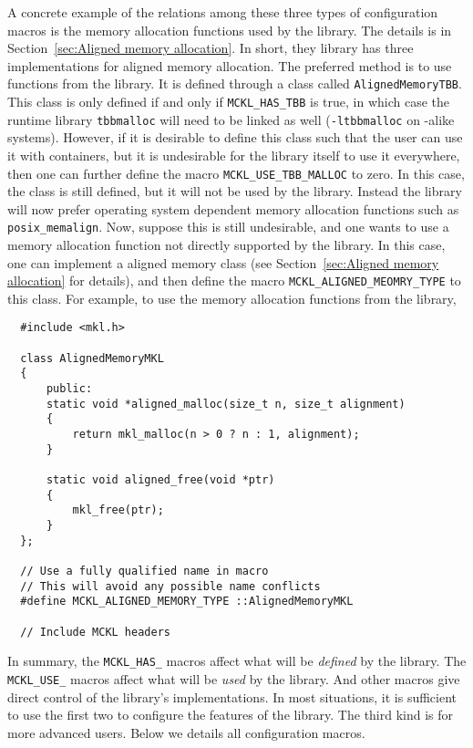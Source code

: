 A concrete example of the relations among these three types of configuration
macros is the memory allocation functions used by the library. The details is
in Section~\ref{sec:Aligned memory allocation}. In short, they library has
three implementations for aligned memory allocation. The preferred method is to
use functions from the \tbb library. It is defined through a class called
\verb|AlignedMemoryTBB|. This class is only defined if and only if
\verb|MCKL_HAS_TBB| is true, in which case the runtime library \verb|tbbmalloc|
will need to be linked as well (\verb|-ltbbmalloc| on \unix-alike systems).
However, if it is desirable to define this class such that the user can use it
with \stl containers, but it is undesirable for the library itself to use it
everywhere, then one can further define the macro \verb|MCKL_USE_TBB_MALLOC| to
zero. In this case, the class is still defined, but it will not be used by the
library. Instead the library will now prefer operating system dependent memory
allocation functions such as \verb|posix_memalign|. Now, suppose this is still
undesirable, and one wants to use a memory allocation function not directly
supported by the library. In this case, one can implement a aligned memory
class (see Section~\ref{sec:Aligned memory allocation} for details), and then
define the macro \verb|MCKL_ALIGNED_MEOMRY_TYPE| to this class. For example, to
use the memory allocation functions from the \mkl library,
\begin{Verbatim}
  #include <mkl.h>

  class AlignedMemoryMKL
  {
      public:
      static void *aligned_malloc(size_t n, size_t alignment)
      {
          return mkl_malloc(n > 0 ? n : 1, alignment);
      }

      static void aligned_free(void *ptr)
      {
          mkl_free(ptr);
      }
  };

  // Use a fully qualified name in macro
  // This will avoid any possible name conflicts
  #define MCKL_ALIGNED_MEMORY_TYPE ::AlignedMemoryMKL

  // Include MCKL headers
\end{Verbatim}
In summary, the \verb|MCKL_HAS_| macros affect what will be \emph{defined} by
the library. The \verb|MCKL_USE_| macros affect what will be \emph{used} by the
library. And other macros give direct control of the library's implementations.
In most situations, it is sufficient to use the first two to configure the
features of the library. The third kind is for more advanced users. Below we
details all configuration macros.

